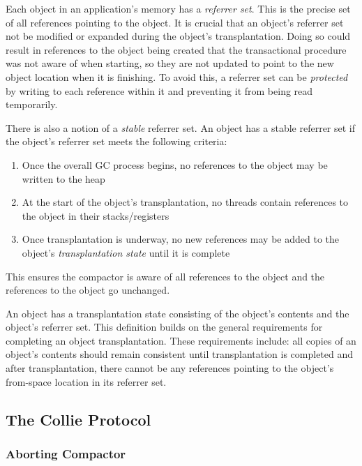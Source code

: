 \documentclass{sig-alternate}
\begin{document}
Each object in an application's memory has a \emph{referrer set}. This is the precise set 
of all references pointing to the object. It is crucial that an object's referrer set not
be modified or expanded during the object's transplantation. Doing so could result
in references to the object being created that the transactional procedure
was not aware of when starting, so they are not updated to point to 
the new object location when it is finishing. To avoid this, a referrer set can be
\emph{protected} by writing to each reference within it and preventing it from
being read temporarily.

There is also a notion of a \emph{stable} referrer set. An object has a stable referrer 
set if the object's referrer set meets the following criteria:
\begin{enumerate}
\item Once the overall GC process begins, no references to the object may be written to the heap
\item At the start of the object's transplantation, no threads contain references to the object in their stacks/registers
\item Once transplantation is underway, no new references may be added to the object's \emph{transplantation state} until it is complete
\end{enumerate}
This ensures the compactor is aware of all references to the object
and the references to the object go unchanged.

An object has a transplantation state consisting of the object's contents 
and the object's referrer set. This definition builds on the general requirements
for completing an object transplantation. These
requirements include: all copies of an object's contents should remain consistent
until transplantation is completed and after transplantation, there cannot be any
references pointing to the object's from-space location in its referrer set.



\subsection{The Collie Protocol}
\label{sec:collieAlgorithm}


\subsubsection{Aborting Compactor}
\label{sec:collieAbortion}
\end{document}
